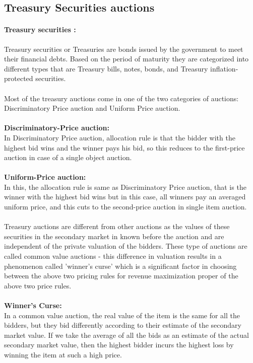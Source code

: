 \documentclass[a4paper]{article}
\begin{document}
\subsection*{Treasury Securities auctions}

\paragraph{Treasury securities :} Treasury securities or Treasuries are bonds issued by the government to meet their financial debts. Based on the period of maturity they are categorized into different types that are Treasury bills, notes, bonds, and Treasury inflation-protected securities.
\\\\
Most of the treasury auctions come in one of the two categories of auctions: Discriminatory Price auction and Uniform Price auction.
\\\\
\textbf{Discriminatory-Price auction:} \\In Discriminatory Price auction, allocation rule is that the bidder with the highest bid wins and the winner pays his bid, so this reduces to the first-price auction in case of a single object auction.
\\\\
\textbf{Uniform-Price auction:} \\In this, the allocation rule is same as Discriminatory Price auction, that is the winner with the highest bid wins but in this case, all winners pay an averaged uniform price, and this cuts to the second-price auction in single item auction.
\\\\
Treasury auctions are different from other auctions as the values of these securities in the secondary market in known before the auction and are independent of the private valuation of the bidders. These type of auctions are called common value auctions - this difference in valuation results in a phenomenon called 'winner's curse' which is a significant factor in choosing between the above two pricing rules for revenue maximization proper of the above two price rules.
\\\\
\textbf{Winner's Curse:}\\ In a common value auction, the real value of the item is the same for all the bidders, but they bid differently according to their estimate of the secondary market value. If we take the average of all the bids as an estimate of the actual secondary market value, then the highest bidder incurs the highest loss by winning the item at such a high price.
\end{document}
